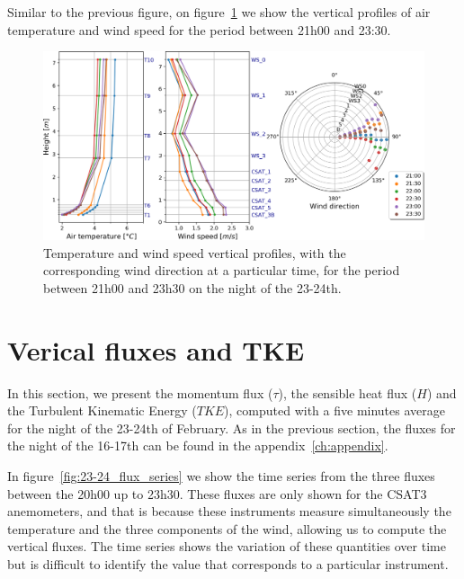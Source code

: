 Similar to the previous figure, on figure~\ref{fig:21-23_profiles.png} we show the vertical profiles of air temperature and wind speed for the period between 21h00 and 23:30. 

\begin{figure}[!ht]
    \centering
    \includegraphics[width=1\textwidth]{fig/chapter_4/23-24/21-23_profiles.png}
    \caption{Temperature and wind speed vertical profiles, with the corresponding wind direction at a particular time, for the period between 21h00 and 23h30 on the night of the 23-24th.}
    \label{fig:21-23_profiles.png}
\end{figure}

\section{Verical fluxes and TKE}

In this section, we present the momentum flux ($\tau$), the sensible heat flux ($H$) and the Turbulent Kinematic Energy ($TKE$), computed with a five minutes average for the night of the 23-24th of February. As in the previous section, the fluxes for the night of the 16-17th can be found in the appendix~\ref{ch:appendix}.

In figure~\ref{fig:23-24_flux_series} we show the time series from the three fluxes between the 20h00 up to 23h30. These fluxes are only shown for the CSAT3 anemometers, and that is because these instruments measure simultaneously the temperature and the three components of the wind, allowing us to compute the vertical fluxes. The time series shows the variation of these quantities over time but is difficult to identify the value that corresponds to a particular instrument.

